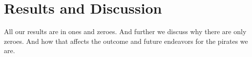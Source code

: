 \chapter{Results and Discussion}\label{results}
All our results are in ones and zeroes. 
And further we discuss why there are only zeroes. And how that affects the
outcome and future endeavors for the pirates we are. 

